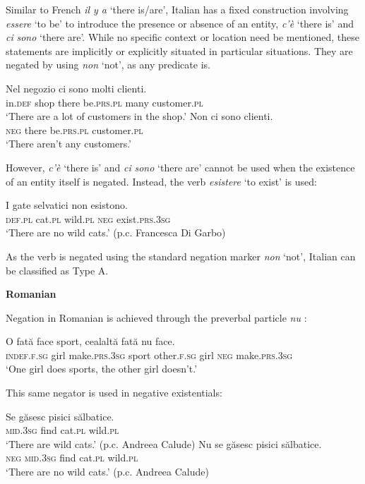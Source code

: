 ﻿\documentclass[output=paper]{langsci/langscibook}
\begin{document}
\begin{unindented}
Similar to French \textit{il y a} `there is/are', Italian has a fixed construction involving \textit{essere} `to be' to introduce the presence or absence of an entity, \textit{c’è} `there is' and \textit{ci} \textit{sono} `there are'. While no specific context or location need be mentioned, these statements are implicitly or explicitly situated in particular situations. They are negated by using \textit{non} `not', as any predicate is. 
%
\begin{exe}\ex \gll
Nel negozio ci sono molti clienti.  \\
in.\textsc{def} shop there be.\textsc{prs.pl} many customer.\textsc{pl} \\
    \glt `There are a lot of customers in the shop.'  \citet[32]{PeyronelHiggins2006}
\ex \gll Non ci sono clienti.  \\
\textsc{neg} there be.\textsc{prs.pl} customer.\textsc{pl} \\
    \glt `There aren't any customers.' \citet[33]{PeyronelHiggins2006}
    \end{exe}

However, \textit{c’è} `there is' and \textit{ci} \textit{sono} `there are' cannot be used when the existence of an entity itself is negated. Instead, the verb \textit{esistere} `to exist' is used:
%
\begin{exe}\ex \gll I gate selvatici non esistono. \\
\textsc{def.pl} cat.\textsc{pl} wild.\textsc{pl} \textsc{neg} exist.\textsc{prs.3sg} \\
    \glt `There are no wild cats.' (p.c. Francesca Di Garbo)
    \end{exe} 

As the verb is negated using the standard negation marker \textit{non} `not', Italian can be classified as Type A.  

\textbf{Romanian}

Negation in Romanian is achieved through the preverbal particle \textit{nu}
\parencite[see][]{Gonczol2008}:
%
\begin{exe}\ex \gll O fată face sport, cealaltă fată nu face.  \\
\textsc{indef.f.sg} girl make.\textsc{prs.3sg} sport other.\textsc{f.sg} girl \textsc{neg} make.\textsc{prs.3sg} \\
    \glt `One girl does sports, the other girl doesn't.' \parencite[36]{Gonczol2008}
    \end{exe}

This same negator is used in negative existentials:
%
\begin{exe}\ex \gll Se găsesc pisici sălbatice.   \\
\textsc{mid.3sg} find cat.\textsc{pl} wild.\textsc{pl} \\
    \glt `There are wild cats.' (p.c. Andreea Calude)
\ex \gll Nu se găsesc pisici sălbatice. \\
\textsc{neg} \textsc{mid.3sg} find cat.\textsc{pl} wild.\textsc{pl} \\
    \glt `There are no wild cats.' (p.c. Andreea Calude)
    \end{exe}


\end{unindented}
\end{document}
